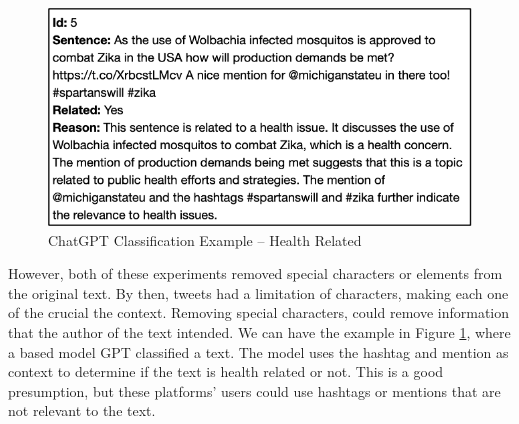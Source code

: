   \begin{figure}[!h]
    \centering
        \includegraphics[width=0.8\linewidth]{images/base_gpt_health.png}
        \caption{ChatGPT Classification Example – Health Related}
        \label{gpt_health}
\end{figure}

However, both of these experiments removed special characters or elements from the original text. By then, tweets had a limitation of characters, making each one of the crucial the context. Removing special
characters, could remove information that the author of the text intended. We can have the example in Figure \ref{gpt_health}, where a based model GPT classified a text. The model uses the hashtag and mention
as context to determine if the text is health related or not. This is a good presumption, but these platforms' users could use hashtags or mentions that are not relevant to the text. 




